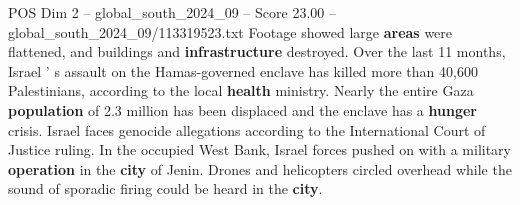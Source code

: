 \begin{textsample}{POS Dim 2 – global\_south\_2024\_09 – Score 23.00 – global\_south\_2024\_09/113319523.txt}
Footage showed large \textbf{areas} were flattened, and buildings and \textbf{infrastructure} destroyed.
Over the last 11 months, Israel ' s assault on the Hamas-governed enclave has killed more than 40,600 Palestinians, according to the local \textbf{health} ministry.
Nearly the entire Gaza \textbf{population} of 2.3 million has been displaced and the enclave has a \textbf{hunger} crisis.
Israel faces genocide allegations according to the International Court of Justice ruling.
In the occupied West Bank, Israel forces pushed on with a military \textbf{operation} in the \textbf{city} of Jenin.
Drones and helicopters circled overhead while the sound of sporadic firing could be heard in the \textbf{city}.

\end{textsample}
